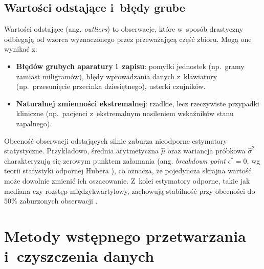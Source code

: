 \subsection{Wartości odstające i~błędy grube}
Wartości odstające (ang. \textit{outliers}) to obserwacje, które w~sposób drastyczny odbiegają od wzorca wyznaczonego przez przeważającą część zbioru. Mogą one wynikać z:
\begin{itemize}
    \item \textbf{Błędów grubych aparatury i~zapisu}: pomyłki jednostek (np.~gramy zamiast miligramów), błędy wprowadzania danych z~klawiatury (np.~przesunięcie przecinka dziesiętnego), usterki czujników.
    \item \textbf{Naturalnej zmienności ekstremalnej}: rzadkie, lecz rzeczywiste przypadki kliniczne (np.~pacjenci z~ekstremalnym nasileniem wskaźników stanu zapalnego).
\end{itemize}
Obecność obserwacji odstających silnie zaburza nieodporne estymatory statystyczne. Przykładowo, średnia arytmetyczna $\hat{\mu}$ oraz wariancja próbkowa $\hat{\sigma}^2$ charakteryzują się zerowym punktem załamania (ang. \textit{breakdown point} $\epsilon^* = 0$, wg teorii statystyki odpornej Hubera \cite{Huber1981}), co oznacza, że pojedyncza skrajna wartość może dowolnie zmienić ich oszacowanie. Z~kolei estymatory odporne, takie jak mediana czy rozstęp międzykwartylowy, zachowują stabilność przy obecności do $50\%$ zaburzonych obserwacji \cite{Huber1981,Walker2021}.

\section{Metody wstępnego przetwarzania i~czyszczenia danych}

